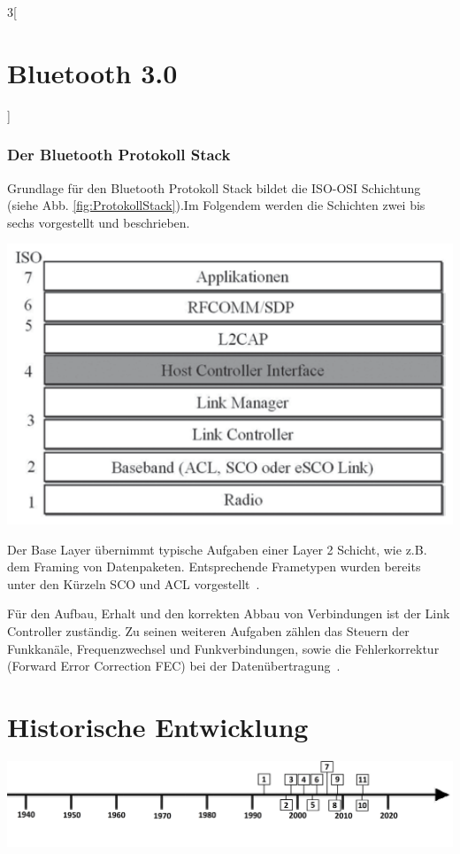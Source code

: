 \begin{multicols}{3}[\section{Bluetooth 3.0}]
\subsubsection*{Der Bluetooth Protokoll Stack}
Grundlage für den Bluetooth Protokoll Stack bildet die ISO-OSI Schichtung (siehe Abb. \ref{fig:ProtokollStack}).Im Folgendem werden die Schichten zwei bis sechs vorgestellt und beschrieben.

\begin{Figure}
\includegraphics[width=\linewidth]{Kapitel/Bluetooth3.0/Grafiken/Protokoll_Stack.png}
\label{fig:ProtokollStack}
\end{Figure}

\noindent
Der Base Layer übernimmt typische Aufgaben einer Layer 2 Schicht, wie z.B. dem Framing von Datenpaketen. Entsprechende Frametypen wurden bereits unter den Kürzeln SCO und ACL vorgestellt~\cite{bluetooth3.0.1}. 

Für den Aufbau, Erhalt und den korrekten Abbau von Verbindungen ist der Link Controller \hspace{1px} zuständig. Zu \hspace{1px} seinen \hspace{1px} weiteren \hspace{1px} Aufgaben zählen das Steuern der Funkkanäle, Frequenzwechsel und Funkverbindungen, sowie die Fehlerkorrektur (Forward Error Correction FEC) bei der Datenübertragung~\cite{bluetooth3.0.3}.

\end{multicols}
\newpage
\section*{Historische Entwicklung}
\includegraphics[width=\textwidth]{Kapitel/Bluetooth3.0/Grafiken/Zeitstrahl}
\par
\noindent

